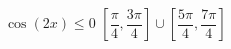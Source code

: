 { $\cos \left( 2x \right) \leq 0$ }
{ $\left[ \dfrac{\pi}{4}, \dfrac{3\pi}{4} \right] \cup \left[ \dfrac{5\pi}{4}, \dfrac{7\pi}{4} \right]$}
